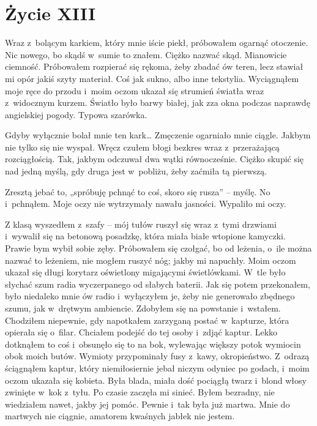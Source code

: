 \chapter{Życie XIII}

Wraz z~bolącym karkiem, który mnie iście piekł, próbowałem ogarnąć otoczenie. Nic nowego, bo skądś w~sumie to znałem. 
Ciężko nazwać skąd. Mianowicie ciemność. Próbowałem rozpierać się rękoma, żeby zbadać ów teren, lecz stawiał mi opór 
jakiś szyty materiał. Coś jak sukno, albo inne tekstylia. Wyciągnąłem moje ręce do przodu i~moim oczom ukazał się 
strumień światła wraz z~widocznym kurzem. Światło było barwy białej, jak zza okna podczas naprawdę angielskiej 
pogody. Typowa szarówka.

Gdyby wyłącznie bolał mnie ten kark… Zmęczenie ogarniało mnie ciągle. Jakbym nie tylko się nie wyspał. Wręcz czułem 
błogi bezkres wraz z~przerażającą rozciągłością. Tak, jakbym odczuwał dwa wątki równocześnie. Ciężko skupić się nad 
jedną myślą, gdy druga jest w~pobliżu, żeby zaćmiła tą pierwszą.

Zresztą jebać to, „spróbuję pchnąć to coś, skoro się rusza” -- myślę. No i~pchnąłem. Moje oczy nie wytrzymały nawału 
jasności. Wypaliło mi oczy.

\paraSep

Z klasą wyszedłem z~szafy -- mój tułów ruszył się wraz z~tymi drzwiami i~wywalił się na betonową posadzkę, która 
miała białe wtopione kamyczki. Prawie bym wybił sobie zęby. Próbowałem się czołgać, bo od leżenia, o~ile można nazwać 
to leżeniem, nie mogłem ruszyć nóg; jakby mi napuchły. Moim oczom ukazał się długi korytarz oświetlony migającymi 
świetlówkami. W~tle było słychać szum radia wyczerpanego od słabych baterii. Jak się potem przekonałem, było 
niedaleko mnie ów radio i~wyłączyłem je, żeby nie generowało zbędnego szumu, jak w~drętwym ambiencie. Zdobyłem się na 
powstanie i~wstałem. Chodziłem niepewnie, gdy napotkałem zarzyganą postać w~kapturze, która opierała się o~filar. 
Chciałem podejść do tej osoby i~zdjąć kaptur. Lekko dotknąłem to coś i~obsunęło się to na bok, wylewając większy 
potok wymiocin obok moich butów. Wymioty przypominały fusy z~kawy, okropieństwo. Z~odrazą ściągnąłem kaptur, który 
niemiłosiernie jebał niczym odyniec po godach, i~moim oczom ukazała się kobieta. Była blada, miała dość pociągłą 
twarz i~blond włosy zwinięte w~kok z~tyłu. Po czasie zaczęła mi sinieć. Byłem bezradny, nie wiedziałem nawet, jakby 
jej pomóc. Pewnie i~tak była już martwa. Mnie do martwych nie ciągnie, amatorem kwaśnych jabłek nie jestem.

